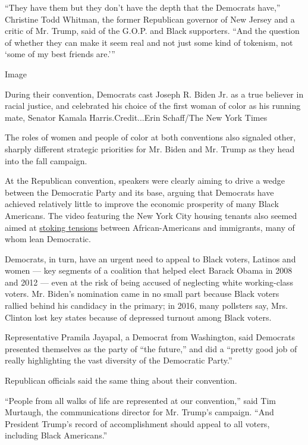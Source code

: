 ``They have them but they don't have the depth that the Democrats
have,'' Christine Todd Whitman, the former Republican governor of New
Jersey and a critic of Mr. Trump, said of the G.O.P. and Black
supporters. ``And the question of whether they can make it seem real and
not just some kind of tokenism, not `some of my best friends are.'''

Image

During their convention, Democrats cast Joseph R. Biden Jr. as a true
believer in racial justice, and celebrated his choice of the first woman
of color as his running mate, Senator Kamala Harris.Credit...Erin
Schaff/The New York Times

The roles of women and people of color at both conventions also signaled
other, sharply different strategic priorities for Mr. Biden and Mr.
Trump as they head into the fall campaign.

At the Republican convention, speakers were clearly aiming to drive a
wedge between the Democratic Party and its base, arguing that Democrats
have achieved relatively little to improve the economic prosperity of
many Black Americans. The video featuring the New York City housing
tenants also seemed aimed at
\href{https://www.nytimes3xbfgragh.onion/2020/08/26/us/politics/trump-naturalization-ceremony-rnc.html}{stoking
tensions} between African-Americans and immigrants, many of whom lean
Democratic.

Democrats, in turn, have an urgent need to appeal to Black voters,
Latinos and women --- key segments of a coalition that helped elect
Barack Obama in 2008 and 2012 --- even at the risk of being accused of
neglecting white working-class voters. Mr. Biden's nomination came in no
small part because Black voters rallied behind his candidacy in the
primary; in 2016, many pollsters say, Mrs. Clinton lost key states
because of depressed turnout among Black voters.

Representative Pramila Jayapal, a Democrat from Washington, said
Democrats presented themselves as the party of ``the future,'' and did a
``pretty good job of really highlighting the vast diversity of the
Democratic Party.''

Republican officials said the same thing about their convention.

``People from all walks of life are represented at our convention,''
said Tim Murtaugh, the communications director for Mr. Trump's campaign.
``And President Trump's record of accomplishment should appeal to all
voters, including Black Americans.''

